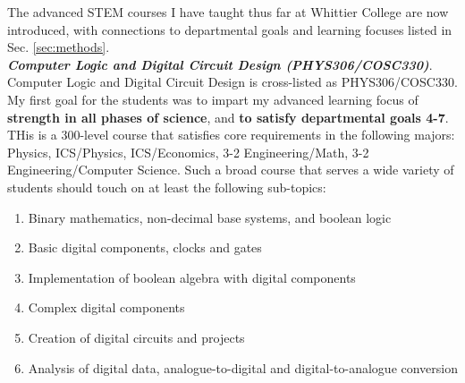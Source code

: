 \documentclass[../../../main.tex]{subfiles}
\begin{document}
The advanced STEM courses I have taught thus far at Whittier College are now introduced, with connections to departmental goals and learning focuses listed in Sec. \ref{sec:methods}.
\\
\vspace{0.25cm}
\textbf{\textit{Computer Logic and Digital Circuit Design (PHYS306/COSC330)}}. Computer Logic and Digital Circuit Design is cross-listed as PHYS306/COSC330.  My first goal for the students was to impart my advanced learning focus of \textbf{strength in all phases of science}, and \textbf{to satisfy departmental goals 4-7}.  THis is a 300-level course that satisfies core requirements in the following majors: Physics, ICS/Physics, ICS/Economics, 3-2 Engineering/Math, 3-2 Engineering/Computer Science.  Such a broad course that serves a wide variety of students should touch on at least the following sub-topics:

\begin{enumerate}
\item Binary mathematics, non-decimal base systems, and boolean logic
\item Basic digital components, clocks and gates
\item Implementation of boolean algebra with digital components
\item Complex digital components
\item Creation of digital circuits and projects
\item Analysis of digital data, analogue-to-digital and digital-to-analogue conversion
\end{enumerate}
\end{document}
